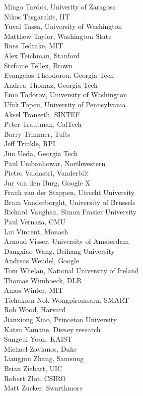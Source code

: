 \begin{multicols}{3}
{Mingo Tardos, Univerity of Zaragosa\\
Nikos Tasgarakis, IIT\\
Yuval Tassa, University of Washington\\
Matthew Taylor, Washington State\\
Russ Tedrake, MIT\\
Alex Teichman, Stanford\\
Stefanie Tellex, Brown\\
Evangelos Theodorou, Georgia Tech\\
Andrea Thomaz, Georgia Tech\\
Emo Todorov, University of Washington\\
Ufuk Topcu, University of Pennsylvania\\
Aksel Transeth, SINTEF\\
Peter Trautman, CalTech\\
Barry Trimmer, Tufts\\
Jeff Trinkle, RPI\\
Jun Ueda, Georgia Tech\\
Paul Umbanhowar, Northwestern\\
Pietro Valdastri, Vanderbilt\\
Jur van den Burg, Google X\\
Frank van der Stappen, Utrecht University\\
Bram Vanderborght, University of Brussels\\
Richard Vaughan, Simon Frasier University\\
Paul Vernaza, CMU\\
Lui Vincent, Monash\\
Arnoud Visser, University of Amsterdam\\
Dangxiao Wang, Beihang University\\
Andreas Wendel, Google\\
Tom Whelan, National University of Ireland\\
Thomas Wimboeck, DLR\\
Amos Winter, MIT\\
Tichakorn Nok Wongpiromsarn, SMART\\
Rob Wood, Harvard\\
Jianxiong Xiao, Princeton University\\
Katsu Yamane, Disney research\\
Sungeui Yoon, KAIST\\
Michael Zavlanos, Duke\\
Liangjun Zhang, Samsung\\
Brian Ziebart, UIC\\
Robert Zlot, CSIRO\\
Matt Zucker, Swarthmore\\
}
\end{multicols}
\vfill
